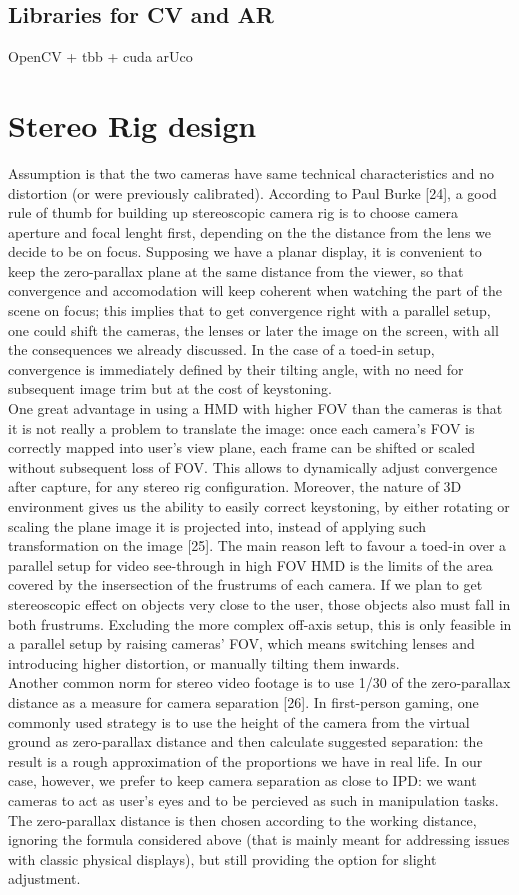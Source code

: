 \subsection{Libraries for CV and AR}
OpenCV + tbb + cuda
arUco
\fi

\section{Stereo Rig design}
Assumption is that the two cameras have same technical characteristics and no distortion (or were previously calibrated). According to Paul Burke [24], a good rule of thumb for building up stereoscopic camera rig is to choose camera aperture and focal lenght first, depending on the the distance from the lens we decide to be on focus. Supposing we have a planar display, it is convenient to keep the zero-parallax plane at the same distance from the viewer, so that convergence and accomodation will keep coherent when watching the part of the scene on focus; this implies that to get convergence right with a parallel setup, one could shift the cameras, the lenses or later the image on the screen, with all the consequences we already discussed. In the case of a toed-in setup, convergence is immediately defined by their tilting angle, with no need for subsequent image trim but at the cost of keystoning.\\
One great advantage in using a HMD with higher FOV than the cameras is that it is not really a problem to translate the image: once each camera’s FOV is correctly mapped into user’s view plane, each frame can be shifted or scaled without subsequent loss of FOV. This allows to dynamically adjust convergence after capture, for any stereo rig configuration. Moreover, the nature of 3D environment gives us the ability to easily correct keystoning, by either rotating or scaling the plane image it is projected into, instead of applying such transformation on the image [25]. The main reason left to favour a toed-in over a parallel setup for video see-through in high FOV HMD is the limits of the area covered by the insersection of the frustrums of each camera. If we plan to get stereoscopic effect on objects very close to the user, those objects also must fall in both frustrums. Excluding the more complex off-axis setup, this is only feasible in a parallel setup by raising cameras’ FOV, which means switching lenses and introducing higher distortion, or manually tilting them inwards.\\
Another common norm for stereo video footage is to use 1/30 of the zero-parallax distance as a measure for camera separation [26]. In first-person gaming, one commonly used strategy is to use the height of the camera from the virtual ground as zero-parallax distance and then calculate suggested separation: the result is a rough approximation of the proportions we have in real life. In our case, however, we prefer to keep camera separation as close to IPD: we want cameras to act as user’s eyes and to be percieved as such in manipulation tasks. The zero-parallax distance is then chosen according to the working distance, ignoring the formula considered above (that is mainly meant for addressing issues with classic physical displays), but still providing the option for slight adjustment.
